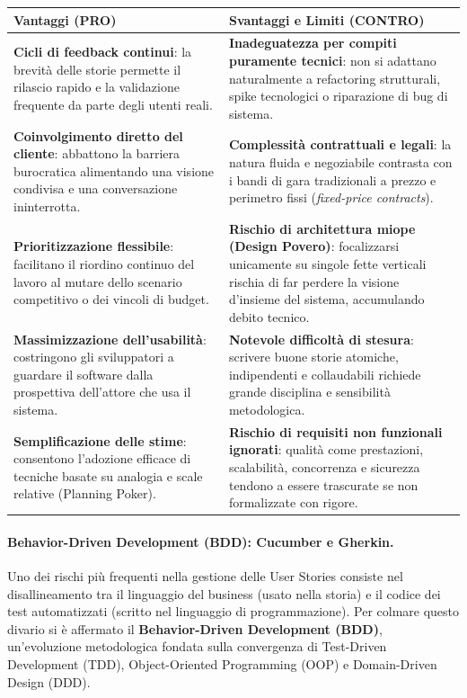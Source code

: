 \documentclass[12pt]{extarticle}
\begin{document}
\begin{center}
\small
\begin{tabular}{p{7cm}p{7cm}}
    \toprule
    \textbf{Vantaggi (PRO)} & \textbf{Svantaggi e Limiti (CONTRO)} \\
    \midrule
    \textbf{Cicli di feedback continui}: la brevità delle storie permette il rilascio rapido e la validazione frequente da parte degli utenti reali. & \textbf{Inadeguatezza per compiti puramente tecnici}: non si adattano naturalmente a refactoring strutturali, spike tecnologici o riparazione di bug di sistema. \\
    \addlinespace
    \textbf{Coinvolgimento diretto del cliente}: abbattono la barriera burocratica alimentando una visione condivisa e una conversazione ininterrotta. & \textbf{Complessità contrattuali e legali}: la natura fluida e negoziabile contrasta con i bandi di gara tradizionali a prezzo e perimetro fissi (\textit{fixed-price contracts}). \\
    \addlinespace
    \textbf{Prioritizzazione flessibile}: facilitano il riordino continuo del lavoro al mutare dello scenario competitivo o dei vincoli di budget. & \textbf{Rischio di architettura miope (Design Povero)}: focalizzarsi unicamente su singole fette verticali rischia di far perdere la visione d'insieme del sistema, accumulando debito tecnico. \\
    \addlinespace
    \textbf{Massimizzazione dell'usabilità}: costringono gli sviluppatori a guardare il software dalla prospettiva dell'attore che usa il sistema. & \textbf{Notevole difficoltà di stesura}: scrivere buone storie atomiche, indipendenti e collaudabili richiede grande disciplina e sensibilità metodologica. \\
    \addlinespace
    \textbf{Semplificazione delle stime}: consentono l'adozione efficace di tecniche basate su analogia e scale relative (Planning Poker). & \textbf{Rischio di requisiti non funzionali ignorati}: qualità come prestazioni, scalabilità, concorrenza e sicurezza tendono a essere trascurate se non formalizzate con rigore. \\
    \bottomrule
\end{tabular}
\end{center}

\paragraph{Behavior-Driven Development (BDD): Cucumber e Gherkin.}
Uno dei rischi più frequenti nella gestione delle User Stories consiste nel disallineamento tra il linguaggio del business (usato nella storia) e il codice dei test automatizzati (scritto nel linguaggio di programmazione). Per colmare questo divario si è affermato il \textbf{Behavior-Driven Development (BDD)}, un'evoluzione metodologica fondata sulla convergenza di Test-Driven Development (TDD), Object-Oriented Programming (OOP) e Domain-Driven Design (DDD).
\end{document}
